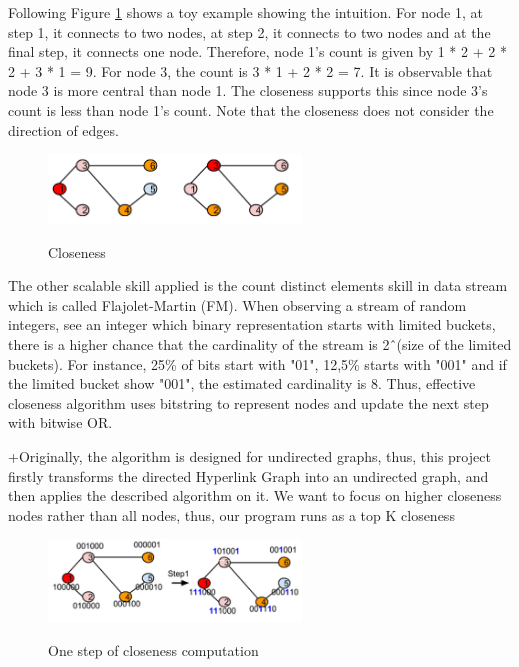 Following Figure \ref{fig3} shows a toy example showing the intuition. For node 1, at step 1, it connects to two nodes, at step 2, it connects to two nodes and at the final step, it  connects one node. Therefore, node 1’s count is given by 1 * 2 + 2 * 2 + 3 * 1 = 9. For node 3, the count is 3 * 1 + 2 * 2 = 7. It is observable that node 3 is more central than node 1. The closeness supports this since node 3’s count is less than node 1’s count. Note that the closeness does not consider the direction of edges.

\begin{figure}[H]
	\begin{center}
		\label{fig3}		
		\includegraphics[width=0.6\textwidth]{fig3}	
		\caption{Closeness}	
	\end{center}
\end{figure}

The other scalable skill applied is the count distinct elements skill in data stream which is called Flajolet-Martin (FM).  When observing a stream of random integers, see an integer which binary representation starts with limited buckets, there is a higher chance that the cardinality of the stream is 2\^\ (size of the limited buckets). For instance, 25\% of bits start with "01", 12,5\% starts with "001" and if the limited bucket show "001", the estimated cardinality is 8. Thus, effective closeness algorithm uses bitstring to represent nodes and update the next step with bitwise OR. 

+Originally, the algorithm is designed for undirected graphs, thus, this project firstly transforms the directed Hyperlink Graph into an undirected graph, and then applies the described algorithm on it. We want to focus on higher closeness nodes rather than all nodes, thus, our program runs as a top K closeness

\begin{figure}[H]
	\begin{center}
		\label{fig4}		
		\includegraphics[width=0.6\textwidth]{fig4}	
		\caption{One step of closeness computation}	
	\end{center}
\end{figure}

